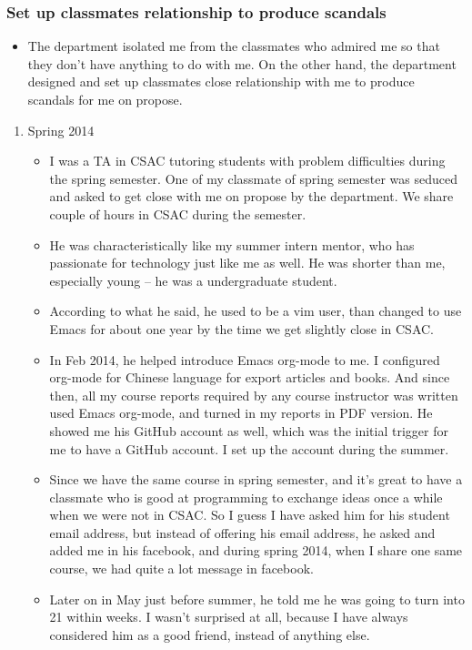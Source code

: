 \documentclass[9pt,b5paper]{article}
\begin{document}
\subsubsection{Set up classmates relationship to produce scandals}
\label{sec-12-3-8}
\begin{itemize}
\item The department isolated me from the classmates who admired me so that they don't have anything to do with me. On the other hand, the department designed and set up classmates close relationship with me to produce scandals for me on propose.
\end{itemize}
\begin{enumerate}
\item Spring 2014
\label{sec-12-3-8-1}
\begin{itemize}
\item I was a TA in CSAC tutoring students with problem difficulties during the spring semester. One of my classmate of spring semester was seduced and asked to get close with me on propose by the department. We share couple of hours in CSAC during the semester.
\item He was characteristically like my summer intern mentor, who has passionate for technology just like me as well. He was shorter than me, especially young -- he was a undergraduate student.
\item According to what he said, he used to be a vim user, than changed to use Emacs for about one year by the time we get slightly close in CSAC.
\item In Feb 2014, he helped introduce Emacs org-mode to me. I configured org-mode for Chinese language for export articles and books. And since then, all my course reports required by any course instructor was written used Emacs org-mode, and turned in my reports in PDF version. He showed me his GitHub account as well, which was the initial trigger for me to have a GitHub account. I set up the account during the summer.
\item Since we have the same course in spring semester, and it's great to have a classmate who is good at programming to exchange ideas once a while when we were not in CSAC. So I guess I have asked him for his student email address, but instead of offering his email address, he asked and added me in his facebook, and during spring 2014, when I share one same course, we had quite a lot message in facebook.
\item Later on in May just before summer, he told me he was going to turn into 21 within weeks. I wasn't surprised at all, because I have always considered him as a good friend, instead of anything else.

\end{itemize}
\end{enumerate}
\end{document}
